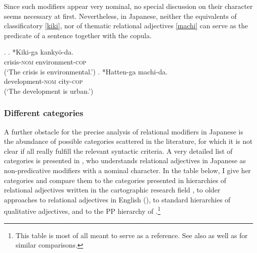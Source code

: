 Since such modifiers appear very nominal, no special discussion on their character seems necessary at first. Nevertheless, in Japanese, neither the equivalents of classificatory \ref{kiki}, nor of thematic relational adjectives \ref{machi} can serve as the predicate of a sentence together with the copula.

\ex. \ag. *Kiki-ga kankyō-da.\\
crisis-\textsc{nom} environment-\textsc{cop}\\
(`The crisis is environmental.’) \label{kiki}
\bg. *Hatten-ga machi-da.\\
development-\textsc{nom} city-\textsc{cop}\\
(`The development is urban.’) \label{machi}

\subsubsection{Different categories}
\largerpage[1.5]
A further obstacle for the precise analysis of relational modifiers in Japanese is the abundance of possible categories scattered in the literature, for which it is not clear if all really fulfill the relevant syntactic criteria. A very detailed list of categories is presented in \citet[53–54]{nagano:2016:are}, who understands relational adjectives in Japanese as non-predicative modifiers with a nominal character. In the table below, I give her categories and compare them to the categories presented in hierarchies of relational adjectives written in the cartographic research field \citep{rae:2010:ordering, bortolotto:2016:RA}, to older approaches to relational adjectives in  English (\citealt{downing:1977:creation, levi:1978:syntax, warren:1984:classifying}), to standard hierarchies of qualitative adjectives, and to the PP hierarchy of \citet{takamine:2010:hierarchy}.\footnote{This
    table is most of all meant to serve as a reference. See also \citet[93–94]{bortolotto:2016:RA} as well as \citet[16]{rainer:2013:can} for similar comparisons.}

